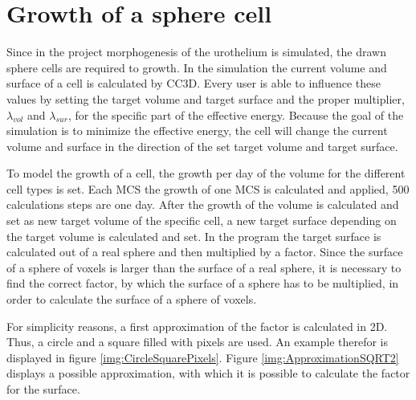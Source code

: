 \section{Growth of a sphere cell}
Since in the project morphogenesis of the urothelium is simulated, the drawn sphere cells are required to growth. \newline
In the simulation the current volume and surface of a cell is calculated by \ac{CC3D}. Every user is able to influence these values by setting the target volume and target surface and the proper multiplier, $\lambda_{vol}$ and $\lambda_{sur}$, for the specific part of the effective energy. Because the goal of the simulation is to minimize the effective energy, the cell will change the current volume and surface in the direction of the set target volume and target surface. 

To model the growth of a cell, the growth per day of the volume for the different cell types is set. Each \ac{MCS} the growth of one \ac{MCS} is calculated and applied, 500 calculations steps are one day. After the growth of the volume is calculated and set as new target volume of the specific cell, a new target surface depending on the target volume is calculated and set. \newline
In the program the target surface is calculated out of a real sphere and then multiplied by a factor.
Since the surface of a sphere of voxels is larger than the surface of a real sphere, it is necessary to find the correct factor, by which the surface of a sphere has to be multiplied, in order to calculate the surface of a sphere of voxels. 

For simplicity reasons, a first approximation of the factor is calculated in 2D. Thus, a circle and a square filled with pixels are used. An example therefor is displayed in figure \ref{img:CircleSquarePixels}. \newline
Figure \ref{img:ApproximationSQRT2} displays a possible approximation, with which it is possible to calculate the factor for the surface. 

